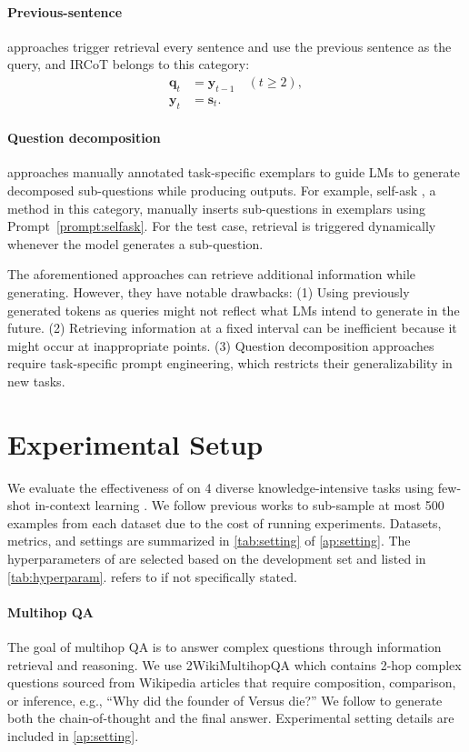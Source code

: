 \paragraph{Previous-sentence} approaches trigger retrieval every sentence and use the previous sentence as the query, and IRCoT \cite{ircot-trivedi-2022} belongs to this category:
\begin{align*}
\bm{q}_t &= \bm{y}_{t-1} \quad (t \ge 2), \\
\bm{y}_t &= \bm{s}_t.
\end{align*}

\paragraph{Question decomposition} approaches manually annotated task-specific exemplars to guide LMs to generate decomposed sub-questions while producing outputs.
For example, self-ask \cite{selfask-press-2022}, a method in this category, manually inserts sub-questions in exemplars using Prompt~\autoref{prompt:selfask}.
For the test case, retrieval is triggered dynamically whenever the model generates a sub-question.

The aforementioned approaches can retrieve additional information while generating.
However, they have notable drawbacks: (1) Using previously generated tokens as queries might not reflect what LMs intend to generate in the future. (2) Retrieving information at a fixed interval can be inefficient because it might occur at inappropriate points. (3) Question decomposition approaches require task-specific prompt engineering, which restricts their generalizability in new tasks.

\section{Experimental Setup}
We evaluate the effectiveness of \ours on 4 diverse knowledge-intensive tasks using few-shot in-context learning \cite{radford-2019-gpt2,gpt3-brown-2020,liu-2023-ppp}.
We follow previous works \cite{ircot-trivedi-2022} to sub-sample at most 500 examples from each dataset due to the cost of running experiments.
Datasets, metrics, and settings are summarized in \autoref{tab:setting} of \autoref{ap:setting}.
The hyperparameters of \ours are selected based on the development set and listed in \autoref{tab:hyperparam}.
\ours refers to \oursd if not specifically stated.

\paragraph{Multihop QA}
The goal of multihop QA is to answer complex questions through information retrieval and reasoning.
We use 2WikiMultihopQA \cite{2wikimultihopqa-ho-2020} which contains 2-hop complex questions sourced from Wikipedia articles that require composition, comparison, or inference, e.g., ``Why did the founder of Versus die?''
We follow \citet{selfconsist-wang-2022} to generate both the chain-of-thought and the final answer.
Experimental setting details are included in \autoref{ap:setting}.

